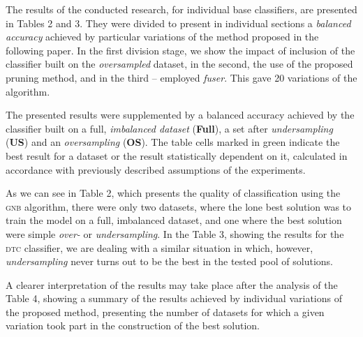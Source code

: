 \documentclass[pmlr]{jmlr}
\begin{document}
The results of the conducted research, for individual base classifiers, are presented in Tables 2 and 3. They were divided to present in individual sections a \emph{balanced accuracy} achieved by particular variations of the method proposed in the following paper. In the first division stage, we show the impact of inclusion of the classifier built on the \emph{oversampled} dataset, in the second, the use of the proposed pruning method, and in the third -- employed \emph{fuser}. This gave 20 variations of the algorithm.

The presented results were supplemented by a balanced accuracy achieved by the classifier built on a full, \emph{imbalanced dataset} (\textbf{Full}), a set after \emph{undersampling} (\textbf{US}) and an \emph{oversampling} (\textbf{OS}). The table cells marked in green indicate the best result for a dataset or the result statistically dependent on it, calculated in accordance with previously described assumptions of the experiments.

\begin{table}
\end{table}


\begin{table}
\end{table}

As we can see in Table 2, which presents the quality of classification using the \textsc{gnb} algorithm, there were only two datasets, where the lone best solution was to train the model on a full, imbalanced dataset, and one where the best solution were simple \emph{over-} or \emph{undersampling}. In the Table 3, showing the results for the \textsc{dtc} classifier, we are dealing with a similar situation in which, however, \emph{undersampling} never turns out to be the best in the tested pool of solutions.

A clearer interpretation of the results may take place after the analysis of the Table 4, showing a summary of the results achieved by individual variations of the proposed method, presenting the number of datasets for which a given variation took part in the construction of the best solution.
\end{document}
